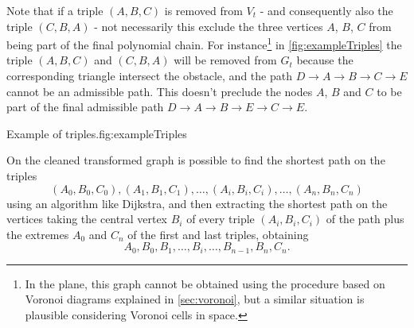 \documentclass[dissertation.tex]{subfiles}
\begin{document}
Note that if a triple $(A,B,C)$ is removed from $V_t$ - and
consequently also the triple $(C,B,A)$ - not necessarily this exclude
the three vertices $A$, $B$, $C$ from being part of the final
polynomial chain. For instance\footnote{In the plane, this graph cannot be
  obtained using the procedure based on Voronoi diagrams explained in
  \cref{sec:voronoi}, but a similar situation is plausible
  considering Voronoi cells in space.} in
\cref{fig:exampleTriples} the triple
$(A,B,C)$ and $(C,B,A)$ will be removed from $G_t$ because
the corresponding triangle intersect the obstacle, and the path
$D\rightarrow A\rightarrow B\rightarrow C\rightarrow E$ cannot be an
admissible path. This doesn't preclude the nodes $A$, $B$ and $C$ to be part
of the final admissible path $D\rightarrow A\rightarrow B\rightarrow E\rightarrow C\rightarrow E$.
\begin{myfig}{Example of triples.}{fig:exampleTriples}
\end{myfig}

On the cleaned transformed graph is possible to find the shortest path on the
triples
$$
(A_0,B_0,C_0), (A_1,B_1,C_1),\dots,(A_i,B_i,C_i),\dots,(A_n,B_n,C_n)
$$
 using
an algorithm like Dijkstra, and then extracting the shortest
path on the vertices taking the central vertex $B_i$ of every
triple $(A_i,B_i,C_i)$ of the path plus the extremes $A_0$ and $C_n$
of the first and last triples, obtaining
$$
A_0,B_0,B_1,\dots,B_i,\dots,B_{n-1},B_n,C_n.
$$
\end{document}
